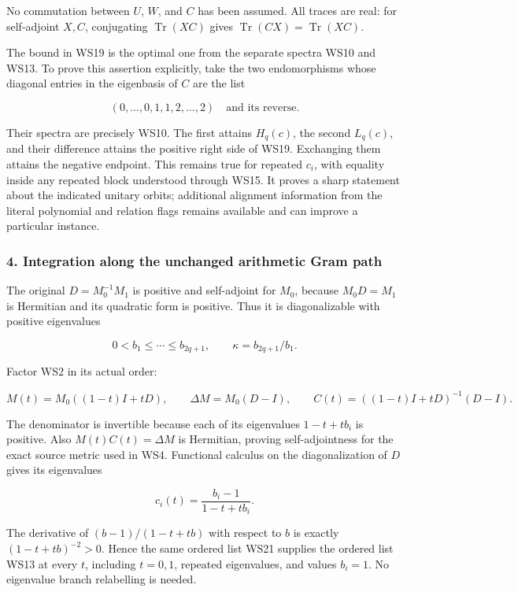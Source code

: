\documentclass{article}
\begin{document}
No commutation between \(U\), \(W\), and \(C\) has been assumed. All traces are real: for self-adjoint \(X,C\), conjugating \(\operatorname{Tr}(XC)\) gives \(\operatorname{Tr}(CX)=\operatorname{Tr}(XC)\).

The bound in WS19 is the optimal one from the separate spectra WS10 and WS13. To prove this assertion explicitly, take the two endomorphisms whose diagonal entries in the eigenbasis of \(C\) are the list

\[
(0,\ldots,0,1,1,2,\ldots,2)
\quad\text{and its reverse}.
\tag{WS20}
\]

Their spectra are precisely WS10. The first attains \(H_q(c)\), the second \(L_q(c)\), and their difference attains the positive right side of WS19. Exchanging them attains the negative endpoint. This remains true for repeated \(c_i\), with equality inside any repeated block understood through WS15. It proves a sharp statement about the indicated unitary orbits; additional alignment information from the literal polynomial and relation flags remains available and can improve a particular instance.

\subsubsection{4. Integration along the unchanged arithmetic Gram path}\label{endpoint-window_review--integration-along-the-unchanged-arithmetic-gram-path}

The original \(D=M_0^{-1}M_1\) is positive and self-adjoint for \(M_0\), because \(M_0D=M_1\) is Hermitian and its quadratic form is positive. Thus it is diagonalizable with positive eigenvalues

\[
0<b_1\le\cdots\le b_{2q+1},
\qquad\kappa=b_{2q+1}/b_1.
\tag{WS21}
\]

Factor WS2 in its actual order:

\[
M(t)=M_0((1-t)I+tD),
\qquad\Delta M=M_0(D-I),
\qquad
C(t)=((1-t)I+tD)^{-1}(D-I).
\tag{WS22}
\]

The denominator is invertible because each of its eigenvalues \(1-t+tb_i\) is positive. Also \(M(t)C(t)=\Delta M\) is Hermitian, proving self-adjointness for the exact source metric used in WS4. Functional calculus on the diagonalization of \(D\) gives its eigenvalues

\[
c_i(t)=\frac{b_i-1}{1-t+tb_i}.
\tag{WS23}
\]

The derivative of \((b-1)/(1-t+tb)\) with respect to \(b\) is exactly \((1-t+tb)^{-2}>0\). Hence the same ordered list WS21 supplies the ordered list WS13 at every \(t\), including \(t=0,1\), repeated eigenvalues, and values \(b_i=1\). No eigenvalue branch relabelling is needed.
\end{document}
